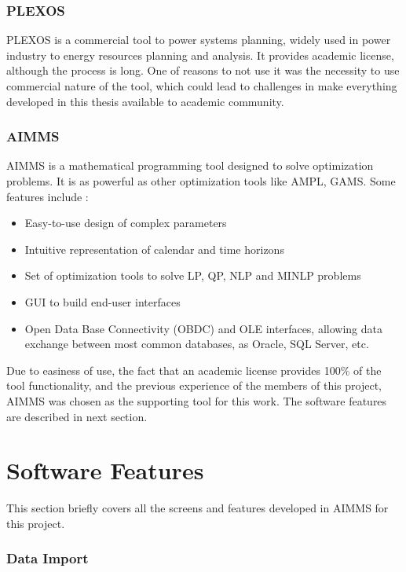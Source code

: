 \documentclass[12pt,LUDisStyle,twosided]{book}
\begin{document}
\subsubsection{PLEXOS \textregistered }

PLEXOS \textregistered is a commercial tool to power systems planning, widely used in power industry to energy resources planning and analysis. It provides academic license, although the process is long. One of reasons to not use it was the necessity to use commercial nature of the tool, which could lead to challenges in make everything developed in this thesis available to academic community.  

\subsubsection{AIMMS}


AIMMS is a mathematical programming tool designed to solve optimization problems. It is as powerful as other optimization tools like AMPL, GAMS. Some features include \cite{bisschop}:

\begin{itemize}
\item Easy-to-use design of complex parameters
\item Intuitive representation of calendar and time horizons
\item Set of optimization tools to solve LP, QP, NLP and MINLP problems
\item GUI to build end-user interfaces
\item Open Data Base Connectivity (OBDC) and OLE interfaces, allowing data exchange between most common databases, as Oracle, SQL Server, etc.
\end{itemize}

Due to easiness of use, the fact that an academic license provides 100\% of the tool functionality, and the previous experience of the members of this project, AIMMS was chosen as the supporting tool for this work. The software features are described in next section.

\section{Software Features}

This section briefly covers all the screens and features developed in AIMMS for this project.

\subsubsection{Data Import}
\end{document}
